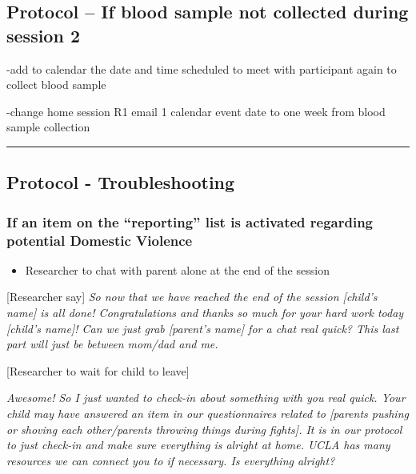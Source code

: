 \documentclass[]{book}
\providecommand{\tightlist}{%
  \setlength{\itemsep}{0pt}\setlength{\parskip}{0pt}}
\begin{document}
\hypertarget{protocol-if-blood-sample-not-collected-during-session-2-1}{%
\subsection{Protocol -- If blood sample not collected during session 2}\label{protocol-if-blood-sample-not-collected-during-session-2-1}}

-add to calendar the date and time scheduled to meet with participant again to collect blood sample

-change home session R1 email 1 calendar event date to one week from blood sample collection

\begin{center}\rule{0.5\linewidth}{0.5pt}\end{center}

\hypertarget{protocol---troubleshooting-1}{%
\subsection{Protocol - Troubleshooting}\label{protocol---troubleshooting-1}}

\hypertarget{if-an-item-on-the-reporting-list-is-activated-regarding-potential-domestic-violence-1}{%
\subsubsection{If an item on the ``reporting'' list is activated regarding potential Domestic Violence}\label{if-an-item-on-the-reporting-list-is-activated-regarding-potential-domestic-violence-1}}

\begin{itemize}
\tightlist
\item
  Researcher to chat with parent alone at the end of the session
\end{itemize}

{[}Researcher say{]} \emph{So now that we have reached the end of the session {[}child's name{]} is all done! Congratulations and thanks so much for your hard work today {[}child's name{]}! Can we just grab {[}parent's name{]} for a chat real quick? This last part will just be between mom/dad and me.}

{[}Researcher to wait for child to leave{]}

\emph{Awesome! So I just wanted to check-in about something with you real quick. Your child may have answered an item in our questionnaires related to {[}parents pushing or shoving each other/parents throwing things during fights{]}. It is in our protocol to just check-in and make sure everything is alright at home. UCLA has many resources we can connect you to if necessary. Is everything alright?}
\end{document}
